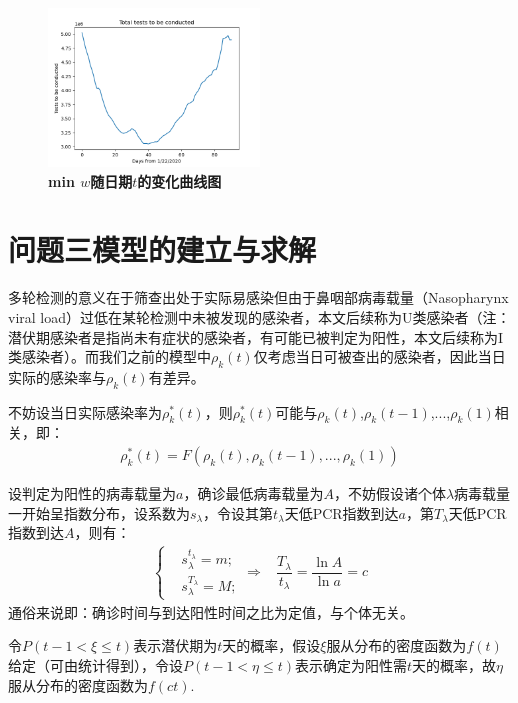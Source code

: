 \documentclass[withoutpreface,bwprint]{cumcmthesis} %
\begin{document}
\begin{figure}[H]
\centering
\includegraphics[width=0.5\textwidth]{nyc_total_tests_to_be_conducted.png}
\caption{\textbf{\rm{min} $w$随日期$t$的变化曲线图}}
\label{pro1}
\end{figure}

\section{问题三模型的建立与求解}
多轮检测的意义在于筛查出处于实际易感染但由于鼻咽部病毒载量（Nasopharynx viral load）过低在某轮检测中未被发现的感染者，本文后续称为U类感染者（注：潜伏期感染者是指尚未有症状的感染者，有可能已被判定为阳性，本文后续称为I类感染者）。而我们之前的模型中$\rho_k(t)$仅考虑当日可被查出的感染者，因此当日实际的感染率与$\rho_k(t)$有差异。

不妨设当日实际感染率为$\rho^*_k(t)$，则$\rho^*_k(t)$可能与$\rho_k(t)$,$\rho_k(t-1)$,...,$\rho_k(1)$相关，即：
\begin{align}
    \rho^*_k(t) = F\left(\rho_k(t),\rho_k(t-1),...,\rho_k(1) \right)
\end{align}

设判定为阳性的病毒载量为$a$，确诊最低病毒载量为$A$，不妨假设诸个体$\lambda$病毒载量一开始呈指数分布，设系数为$s_\lambda$，令设其第$t_\lambda$天低PCR指数到达$a$，第$T_\lambda$天低PCR指数到达$A$，则有：
\begin{align}
\left\{
\begin{aligned}
    & s^{t_\lambda}_{\lambda}=m; \\
    & s^{T_\lambda}_{\lambda}=M; 
\end{aligned}
    \right.
    \Rightarrow & \dfrac{T_\lambda}{t_\lambda}=\dfrac{\ln A}{\ln a}=c
\end{align}
通俗来说即：确诊时间与到达阳性时间之比为定值，与个体无关。

令$P(t-1<\xi \leqslant t)$表示潜伏期为$t$天的概率，假设$\xi$服从分布的密度函数为$f(t)$给定（可由统计得到），令设$P(t-1< \eta \leqslant t)$表示确定为阳性需$t$天的概率，故$\eta$服从分布的密度函数为$f(ct)$.
\end{document}
